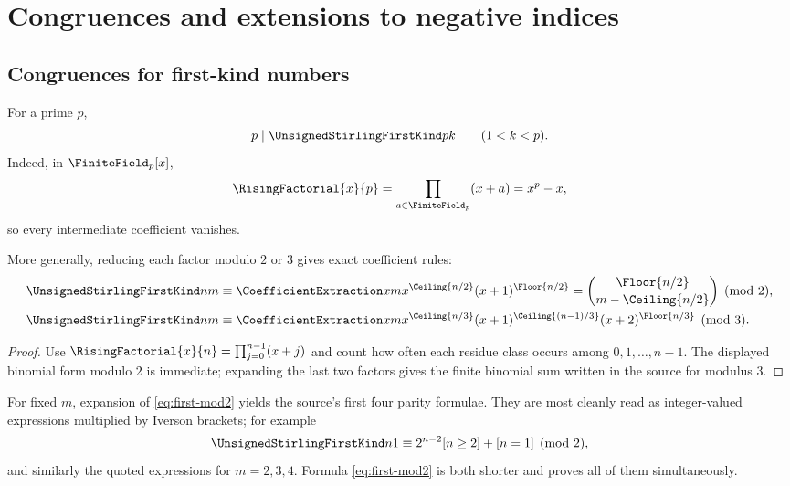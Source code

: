 \documentclass[11pt,a4paper,oneside,openany]{book}
\theoremstyle{definition}
\theoremstyle{remark}
\begin{document}
\chapter{Congruences and extensions to negative indices}
\label{ch:stirling-congruences}

\section{Congruences for first-kind numbers}
For a prime $p$,
\begin{equation}\label{eq:prime-first-divisibility}
 p\mid\UnsignedStirlingFirstKind pk\qquad(1<k<p).
\end{equation}
Indeed, in $\FiniteField_p[x]$,
\[
 \RisingFactorial{x}{p}=\prod_{a\in\FiniteField_p}(x+a)=x^p-x,
\]
so every intermediate coefficient vanishes.

More generally, reducing each factor modulo $2$ or $3$ gives exact coefficient rules:
\begin{align}
 \UnsignedStirlingFirstKind nm
 &\equiv \CoefficientExtraction xm x^{\Ceiling{n/2}}(x+1)^{\Floor{n/2}}
  =\binom{\Floor{n/2}}{m-\Ceiling{n/2}}\pmod2,
 \label{eq:first-mod2}\\
 \UnsignedStirlingFirstKind nm
 &\equiv \CoefficientExtraction xm
 x^{\Ceiling{n/3}}(x+1)^{\Ceiling{(n-1)/3}}(x+2)^{\Floor{n/3}}
 \pmod3.\label{eq:first-mod3}
\end{align}
\begin{proof}
Use $\RisingFactorial{x}{n}=\prod_{j=0}^{n-1}(x+j)$ and count how often each residue class
occurs among $0,1,\ldots,n-1$.  The displayed binomial form modulo $2$ is immediate;
expanding the last two factors gives the finite binomial sum written in the source
for modulus $3$.
\end{proof}

For fixed $m$, expansion of \cref{eq:first-mod2} yields the source's first four
parity formulae.  They are most cleanly read as integer-valued expressions multiplied
by Iverson brackets; for example
\[
 \UnsignedStirlingFirstKind n1\equiv 2^{n-2}[n\ge2]+[n=1]\pmod2,
\]
and similarly the quoted expressions for $m=2,3,4$.  Formula
\cref{eq:first-mod2} is both shorter and proves all of them simultaneously.
\end{document}
